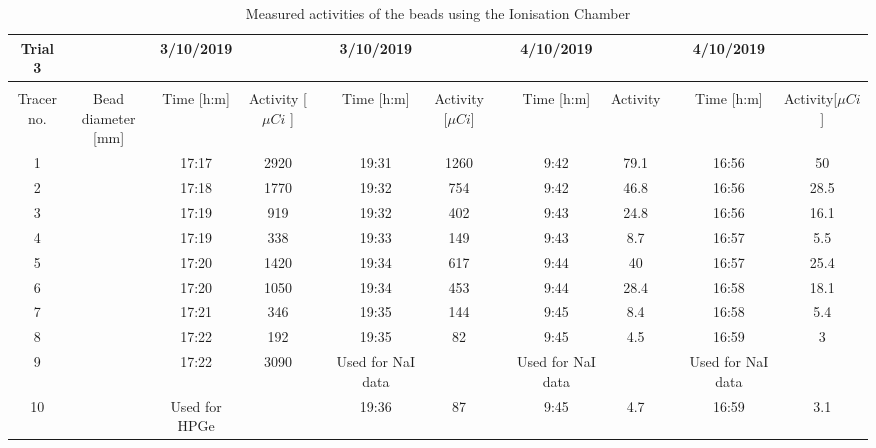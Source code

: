 \documentclass[]{article}
\begin{document}
\begin{appendix}
\begin{table}[h!]
{\begin{tabular}{ccccccccccccc}
			Trial 3    &               & 3/10/2019     &            &  & 3/10/2019         &            &  & 4/10/2019         &          &  & 4/10/2019         &          \\ \hline
			&               &               &            &  &                   &            &  &                   &          &  &                   &          \\ \hline
			Tracer no. & Bead diameter [mm] & Time [h:m]          & Activity  [$\mu Ci$ ]  &  & Time [h:m]              & Activity  [$\mu Ci $]  &  & Time [h:m]              & Activity &  & Time [h:m]              & Activity[$\mu Ci $] \\ \hline
			1          &               & 17:17         & 2920       &  & 19:31             & 1260       &  & 9:42              & 79.1     &  & 16:56             & 50       \\
			2          &               & 17:18         & 1770       &  & 19:32             & 754        &  & 9:42              & 46.8     &  & 16:56             & 28.5     \\
			3          &               & 17:19         & 919        &  & 19:32             & 402        &  & 9:43              & 24.8     &  & 16:56             & 16.1     \\
			4          &               & 17:19         & 338        &  & 19:33             & 149        &  & 9:43              & 8.7      &  & 16:57             & 5.5      \\
			5          &               & 17:20         & 1420       &  & 19:34             & 617        &  & 9:44              & 40       &  & 16:57             & 25.4     \\
			6          &               & 17:20         & 1050       &  & 19:34             & 453        &  & 9:44              & 28.4     &  & 16:58             & 18.1     \\
			7          &               & 17:21         & 346        &  & 19:35             & 144        &  & 9:45              & 8.4      &  & 16:58             & 5.4      \\
			8          &               & 17:22         & 192        &  & 19:35             & 82         &  & 9:45              & 4.5      &  & 16:59             & 3        \\
			9          &               & 17:22         & 3090       &  & Used for NaI data &            &  & Used for NaI data &          &  & Used for NaI data &          \\
			10         &               & Used for HPGe &            &  & 19:36             & 87         &  & 9:45              & 4.7      &  & 16:59             & 3.1      \\ \hline
		\end{tabular}}
	\centering
	\caption{Measured activities of the beads using the Ionisation Chamber}
	\end{table}
	

	
	
\end{appendix}
\end{document}
